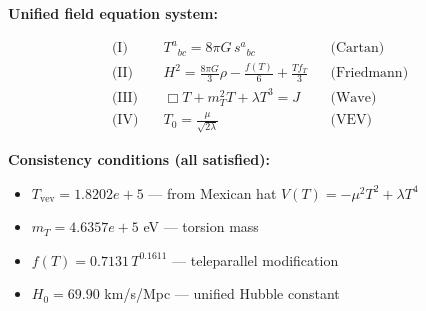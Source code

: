 
\textbf{Unified field equation system:}

\begin{align}
  \text{(I)} \quad & T^a{}_{bc} = 8\pi G \, s^a{}_{bc} && \text{(Cartan)} \\
  \text{(II)} \quad & H^2 = \frac{8\pi G}{3}\rho - \frac{f(T)}{6} + \frac{Tf_T}{3} && \text{(Friedmann)} \\
  \text{(III)} \quad & \Box T + m_T^2 T + \lambda T^3 = J && \text{(Wave)} \\
  \text{(IV)} \quad & T_0 = \frac{\mu}{\sqrt{2\lambda}} && \text{(VEV)}
\end{align}

\textbf{Consistency conditions (all satisfied):}
\begin{itemize}
  \item $T_{\text{vev}} = 1.8202e+5$ — from Mexican hat $V(T) = -\mu^2 T^2 + \lambda T^4$
  \item $m_T = 4.6357e+5$ eV — torsion mass
  \item $f(T) = 0.7131 \, T^{0.1611}$ — teleparallel modification
  \item $H_0 = 69.90$ km/s/Mpc — unified Hubble constant
\end{itemize}